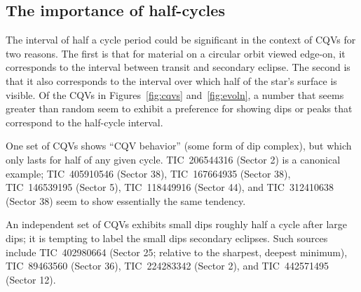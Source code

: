 \documentclass[11pt,twocolumn,tighten]{aastex63}
\begin{document}
%


\subsection{The importance of half-cycles}

The interval of half a cycle period could be significant in the
context of CQVs for two reasons.  The first is that for material on a
circular orbit viewed edge-on, it corresponds to the interval between
transit and secondary eclipse.  The second is that it also corresponds
to the interval over which half of the star's surface is visible.
Of the CQVs in Figures~\ref{fig:cqvs} and~\ref{fig:evoln}, a number
that seems greater than random seem to exhibit a preference for
showing dips or peaks that correspond to the half-cycle interval.

One set of CQVs shows ``CQV behavior'' (some form of dip complex), but
which only lasts for half of any given cycle.
TIC~206544316 (Sector 2) is a canonical example;
TIC~405910546 (Sector 38), TIC~167664935 (Sector 38), TIC~146539195
(Sector 5), TIC~118449916 (Sector 44), and TIC~312410638 (Sector 38)
seem to show essentially the same tendency.

An independent set of CQVs exhibits small dips roughly half a cycle
after large dips; it is tempting to label the small dips secondary
eclipses.
Such sources include 
TIC~402980664 (Sector 25; relative to the sharpest, deepest minimum),
TIC~89463560 (Sector 36),
TIC~224283342 (Sector 2), and TIC~442571495 (Sector 12).
\end{document}
